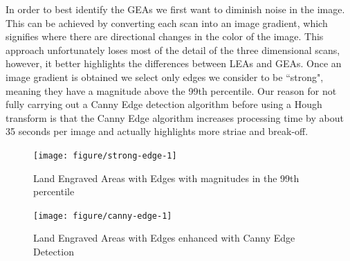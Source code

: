 \documentclass[12pt]{article}\usepackage[]{graphicx}\usepackage[]{color}
\newenvironment{knitrout}{}{} %
\theoremstyle{nonumberplain}
\begin{document}
In order to best identify the GEAs we first want to diminish noise in the image. This can be achieved by converting each scan into an image gradient, which signifies where there are directional changes in the color of the image. This approach unfortunately loses most of the detail of the three dimensional scans, however, it better highlights the differences between LEAs and GEAs. Once an image gradient is obtained we select only edges we consider to be ``strong", meaning they have a magnitude above the 99th percentile. Our reason for not fully carrying out a Canny Edge detection algorithm before using a Hough transform is that the Canny Edge algorithm increases processing time by about 35 seconds per image and actually highlights more striae and break-off. 

\begin{knitrout}
\color{fgcolor}\begin{figure}

{\centering \texttt{[image: figure/strong-edge-1]} 

}

\caption[Land Engraved Areas with Edges with magnitudes in the 99th percentile]{Land Engraved Areas with Edges with magnitudes in the 99th percentile}\label{fig:strong-edge}
\end{figure}


\end{knitrout}

\begin{knitrout}
\color{fgcolor}\begin{figure}

{\centering \texttt{[image: figure/canny-edge-1]} 

}

\caption[Land Engraved Areas with Edges enhanced with Canny Edge Detection]{Land Engraved Areas with Edges enhanced with Canny Edge Detection}\label{fig:canny-edge}
\end{figure}


\end{knitrout}
\end{document}
